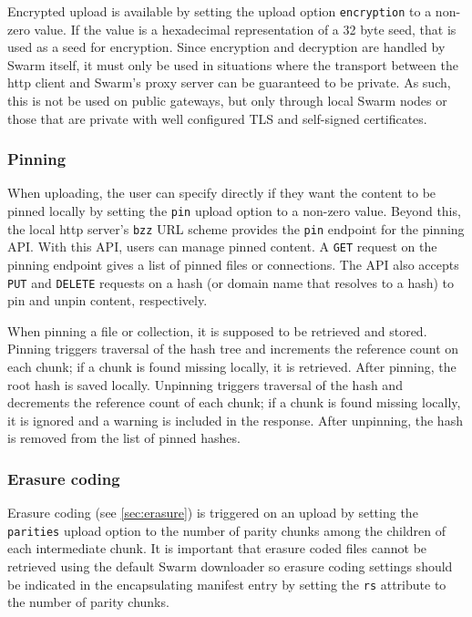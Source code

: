 Encrypted upload is available by setting the upload option \lstinline{encryption} to a non-zero value. If the value is a hexadecimal representation of a 32 byte seed, that is used as a seed for encryption. Since encryption and decryption are handled by Swarm itself, it must only be used in situations where the transport between the http client and Swarm's proxy server can be guaranteed to be private. As such, this is not be used on public gateways, but only through local Swarm nodes or those that are private with well configured TLS and self-signed certificates.

\subsubsection{Pinning}

When uploading, the user can specify directly if they want the content to be pinned locally by setting the \lstinline{pin} upload option to a non-zero value. Beyond this, the local http server's \lstinline{bzz} URL scheme provides the \lstinline{pin} endpoint for the pinning API. With this API, users can manage pinned content. A \lstinline{GET} request on the pinning endpoint gives a list of pinned files or connections.  The API also accepts \lstinline{PUT} and \lstinline{DELETE} requests on a hash (or domain name that resolves to a hash) to pin and unpin content, respectively.  

When pinning a file or collection, it is supposed to be retrieved and stored. Pinning triggers traversal of the hash tree and increments the reference count on each chunk; if a chunk is found missing locally, it is retrieved. After pinning, the root hash is saved locally. Unpinning triggers traversal of the hash and decrements the reference count of each chunk; if a chunk is found missing locally, it is ignored and a warning is included in the response. After unpinning, the hash is removed from the list of pinned hashes. 



\subsubsection{Erasure coding}

Erasure coding (see \ref{sec:erasure}) is triggered on an upload by setting the \lstinline{parities} upload option to the number of parity chunks among the children of each intermediate chunk. It is important that erasure coded files cannot be retrieved using the default Swarm downloader so erasure coding settings should be indicated in the encapsulating manifest entry by setting the \lstinline{rs} attribute to the number of parity chunks. 


